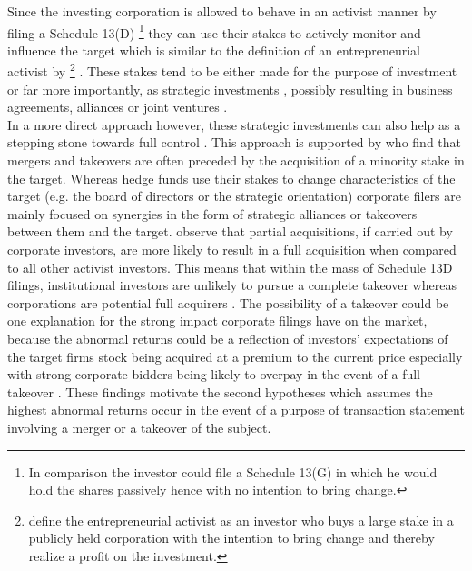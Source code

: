 \documentclass[12pt]{article}
\begin{document}
Since the investing corporation is allowed to behave in an activist manner by filing a Schedule 13(D) 
	\footnote{In comparison the investor could file a Schedule 13(G) in which he would hold the shares passively hence with no intention to bring change.} 
\citep{Brigida2012} they can use their stakes to actively monitor and influence the target which is similar to the definition of an entrepreneurial activist by \footnote{\citet{Klein2009} define the entrepreneurial activist as an investor who buys a large stake in a publicly held corporation with the intention to bring change and thereby realize a profit on the investment.} \citet{Klein2009}.
These stakes tend to be either made for the purpose of investment or far more importantly, as strategic investments \citep{Damodaran2005}, possibly resulting in business agreements, alliances or joint ventures \citep{Allen2000}. \\
In a more direct approach however, these strategic investments can also help as a stepping stone towards full control \citep{Huang2017}. 
This approach is supported by \citet{Goldman2005} who find that mergers and takeovers are often preceded by the acquisition of a minority stake in the target. Whereas hedge funds use their stakes to change characteristics of the target (e.g. the board of directors or the strategic orientation) \citep{Klein2009} corporate filers are mainly focused on synergies in the form of strategic alliances or takeovers between them and the target. \citet{Akhigbe2007} observe that partial acquisitions, if carried out by corporate investors, are more likely to result in a full acquisition when compared to all other activist investors. This means that within the mass of Schedule 13D filings, institutional investors are unlikely to pursue a complete takeover whereas corporations are potential full acquirers \citep{Brigida2012}. The possibility of a takeover could be one explanation for the strong impact corporate filings have on the market, because the abnormal returns could be a reflection of investors' expectations of the target firms stock being acquired at a premium to the current price \citep{Goldman2005} especially with strong corporate bidders being likely to overpay in the event of a full takeover \citep{Akhigbe2007}.
These findings motivate the second hypotheses which assumes the highest abnormal returns occur in the event of a purpose of transaction statement involving a merger or a takeover of the subject.
\end{document}
